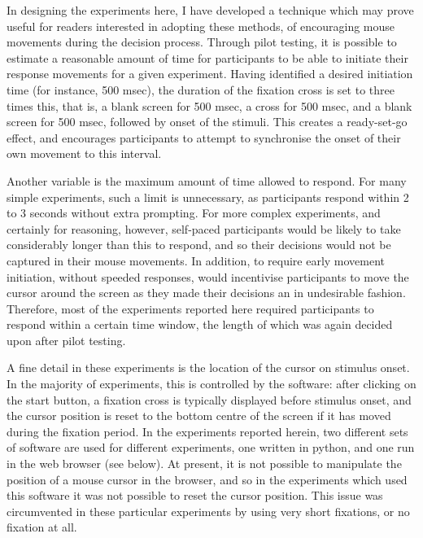 In designing the experiments here,
I have developed a technique which may prove useful 
for readers interested in adopting these methods,
of encouraging mouse movements during the decision process.
Through pilot testing,
it is possible to estimate a reasonable amount of time
for participants to be able to 
initiate their response movements for a given experiment.
Having identified a desired initiation time (for instance, 500 msec),
the duration of the fixation cross is set to three times this,
that is, a blank screen for 500 msec,
a cross for 500 msec,
and a blank screen for 500 msec,
followed by onset of the stimuli.
This creates a ready-set-go effect,
and encourages participants to attempt to synchronise
the onset of their own movement to this interval.

Another variable is the maximum amount of time allowed to respond.
For many simple experiments, such a limit is unnecessary,
as participants respond within 2 to 3 seconds without extra prompting.
For more complex experiments, and certainly for reasoning, however,
self-paced participants would be likely 
to take considerably longer than this to respond,
and so their decisions would not be captured in their mouse movements.
In addition, to require early movement initiation,
without speeded responses,
would incentivise participants to move the cursor around the screen
as they made their decisions an in undesirable fashion.
Therefore, most of the experiments reported here 
required participants to respond within a certain time window,
the length of which was again decided upon after pilot testing.




A fine detail in these experiments is 
the location of the cursor on stimulus onset.
In the majority of experiments, this is controlled by the software:
after clicking on the start button,
a fixation cross is typically displayed before stimulus onset,
and the cursor position is reset to the bottom centre of the screen
if it has moved during the fixation period.
In the experiments reported herein,
two different sets of software are used for different experiments,
one written in python, and one run in the web browser (see below).
At present, it is not possible to manipulate 
the position of a mouse cursor in the browser,
and so in the experiments which used this software
it was not possible to reset the cursor position.
This issue was circumvented in these particular experiments
by using very short fixations, or no fixation at all.

